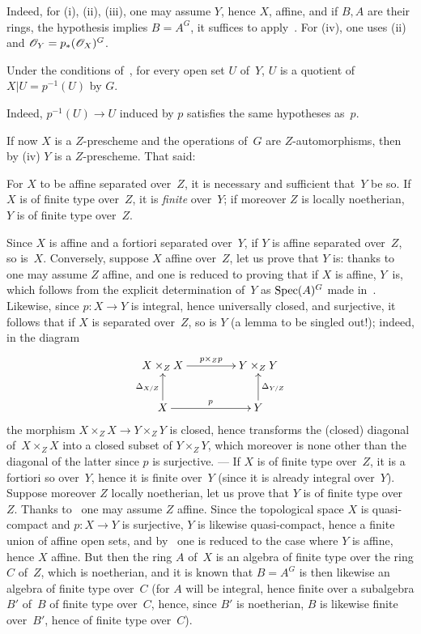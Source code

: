 Indeed, for
(i), (ii), (iii),
one may assume $Y$, hence $X$, affine, and
if $B,A$ are their rings, the hypothesis implies $B=A^G$, it
suffices to apply~. For (iv), one uses (ii) and
$\cal{O}_Y=p_*(\cal{O}_X)^G$.

\begin{corollary}
\label{V.1.4}
Under the conditions of~, for every open set $U$ of~$Y$, $U$
is a quotient of~$X|U=p^{-1}(U)$ by $G$.
\end{corollary}

Indeed, $p^{-1}(U)\to{}U$ induced by $p$ satisfies the same
hypotheses as~$p$.

If now $X$ is a $Z$-prescheme and the operations
of~$G$ are $Z$-automorphisms, then by (iv) $Y$ is a
$Z$-prescheme. That said:

\begin{corollary}
\label{V.1.5}
For $X$ to be affine \resp separated over~$Z$, it is necessary and
sufficient that~$Y$ be so. If $X$ is of finite type over~$Z$, it is
\emph{finite} over~$Y$; if moreover $Z$ is locally noetherian, $Y$
is of finite type over~$Z$.
\end{corollary}

Since $X$ is affine and a fortiori separated over~$Y$, if $Y$ is
affine \resp separated over~$Z$, so
is~$X$. Conversely, suppose $X$ affine over~$Z$, let us prove that
$Y$ is: thanks to~ one may assume $Z$ affine, and
one is reduced to proving that if $X$ is affine, $Y$~is, which
follows from the explicit determination of~$Y$ as
$\operatorname{Spec}(A)^G$ made in~. Likewise, since
$p\colon{}X\to{}Y$ is integral, hence universally closed, and
surjective, it follows that if $X$ is separated over~$Z$, so is
$Y$ (a lemma to be singled out!); indeed, in the diagram
$$
\xymatrix@C=1.5cm{ X \times_ZX\ar[r]^-{p\times_Zp} & Y\times_ZY \\ X
\ar[u]^{\Delta_{X/Z}}\ar[r]^{p} & Y \ar[u]_{\Delta_{Y/Z}} }
$$
the morphism $X\times_ZX\to Y\times_ZY$ is closed, hence transforms
the (closed) diagonal of~$X\times_ZX$ into a closed subset of
$Y\times_ZY$, which moreover is none other than the diagonal of the
latter since $p$ is surjective.
--- If $X$ is of finite type over~$Z$, it is a fortiori so over~$Y$, hence
it is finite over~$Y$ (since it is already integral over~$Y$). Suppose moreover $Z$ locally noetherian, let us prove that
$Y$ is of finite type over~$Z$. Thanks to~ one may
assume $Z$ affine. Since the topological space $X$ is quasi-compact
and $p\colon X\to Y$ is surjective, $Y$ is
likewise
quasi-compact, hence a finite union of
affine open sets, and by~ one is reduced to the case where $Y$ is
affine, hence $X$ affine. But then the ring $A$ of~$X$ is an
algebra of finite type over the ring $C$ of~$Z$, which is
noetherian, and it is known that $B=A^G$ is then likewise
an algebra of finite type over~$C$ (for $A$ will be integral, hence
finite over a subalgebra $B'$ of~$B$ of finite type over~$C$, hence,
since $B'$ is noetherian, $B$ is likewise
finite
over~$B'$, hence of finite type over~$C$).

